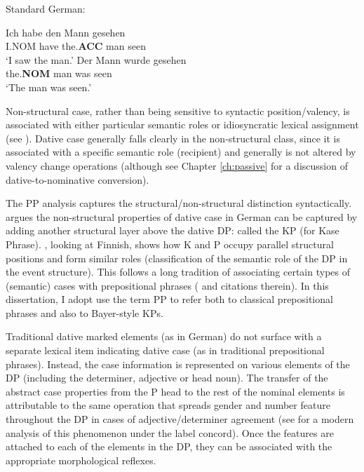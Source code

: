 \begin{exe}
	\ex Standard German:
	\begin{xlist}
		\ex \gll Ich habe den Mann gesehen\\
		I.NOM have the.\textbf{ACC} man seen\\
		\trans `I saw the man.'
		\ex \gll Der Mann wurde gesehen\\
		the.\textbf{NOM} man was seen\\
		\trans `The man was seen.'
	\end{xlist}
\end{exe}

Non-structural case, rather than being sensitive to syntactic position/valency, is associated with either particular semantic roles or idiosyncratic lexical assignment (see \citealt{Woolford.2006}). Dative case generally falls clearly in the non-structural class, since it is associated with a specific semantic role (recipient) and generally is not altered by valency change operations (although see Chapter \ref{ch:passive} for a discussion of dative-to-nominative conversion). 

The PP analysis captures the structural/non-structural distinction syntactically. \cite{Bayer.2001} argues the non-structural properties of dative case in German can be captured by adding another structural layer above the dative DP: called the KP (for Kase Phrase). \cite{Asbury.2007}, looking at Finnish, shows how K and P occupy parallel structural positions and form similar roles (classification of the semantic role of the DP in the event structure). This follows a long tradition of associating certain types of (semantic) cases with prepositional phrases (\citealt{McFadden.2004} and citations therein). In this dissertation, I adopt use the term PP to refer both to classical prepositional phrases and also to Bayer-style KPs.

Traditional dative marked elements (as in German) do not surface with a separate lexical item indicating dative case (as in traditional prepositional phrases). Instead, the case information is represented on various elements of the DP (including the determiner, adjective or head noun). The transfer of the abstract case properties from the P head to the rest of the nominal elements is attributable to the same operation that spreads gender and number feature throughout the DP in cases of adjective/determiner agreement (see \citealt{Norris.2012} for a modern analysis of this phenomenon under the label concord). Once the features are attached to each of the elements in the DP, they can be associated with the appropriate morphological reflexes.

